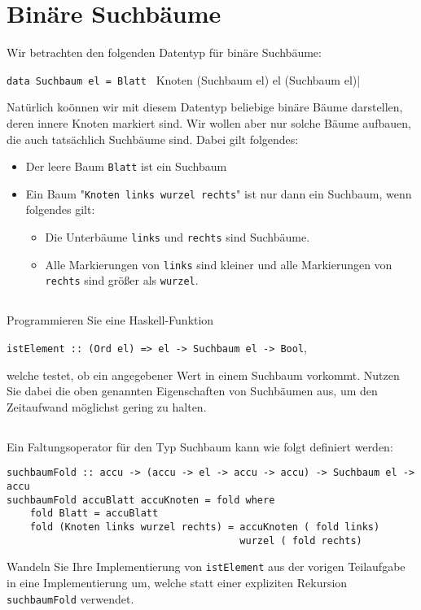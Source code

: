 \documentclass[
  10pt,                   %
  DIV12,
  german,                 %
  oneside,                %
  parskip=half,           %
  headings=normal,        %
  captions=tableheading,  %
]{scrartcl}
\begin{document}
\section{Binäre Suchbäume}
Wir betrachten den folgenden Datentyp für binäre Suchbäume:
\begin{center}
\lstinline|data Suchbaum el = Blatt | Knoten (Suchbaum el) el (Suchbaum el)|
\end{center}
Natürlich koönnen wir mit diesem Datentyp beliebige binäre Bäume darstellen, deren innere Knoten markiert sind. Wir wollen aber nur solche Bäume aufbauen, die auch tatsächlich Suchbäume sind. Dabei gilt folgendes:
\begin{itemize}
\item Der leere Baum \lstinline|Blatt| ist ein Suchbaum 
\item Ein Baum "\lstinline|Knoten links wurzel rechts|" ist nur dann ein Suchbaum, wenn folgendes gilt:
\begin{itemize}
\item Die Unterbäume \lstinline|links| und \lstinline|rechts| sind Suchbäume.
\item Alle Markierungen von \lstinline|links| sind kleiner und alle Markierungen von \lstinline|rechts| sind größer als \lstinline|wurzel|.
\end{itemize}
\end{itemize}
\subsection{}
Programmieren Sie eine Haskell-Funktion
\begin{center}
\lstinline|istElement :: (Ord el) => el -> Suchbaum el -> Bool|,
\end{center}
welche testet, ob ein angegebener Wert in einem Suchbaum vorkommt. Nutzen Sie dabei die oben genannten Eigenschaften von Suchbäumen aus, um den Zeitaufwand möglichst gering zu halten.

\subsection{}
Ein Faltungsoperator für den Typ Suchbaum kann wie folgt definiert werden: 
\begin{lstlisting}
suchbaumFold :: accu -> (accu -> el -> accu -> accu) -> Suchbaum el -> accu
suchbaumFold accuBlatt accuKnoten = fold where
    fold Blatt = accuBlatt
    fold (Knoten links wurzel rechts) = accuKnoten ( fold links)
                                        wurzel ( fold rechts)
\end{lstlisting}
Wandeln Sie Ihre Implementierung von \lstinline|istElement| aus der vorigen Teilaufgabe in eine Implementierung um, welche statt einer expliziten Rekursion \lstinline|suchbaumFold| verwendet.
\end{document}
